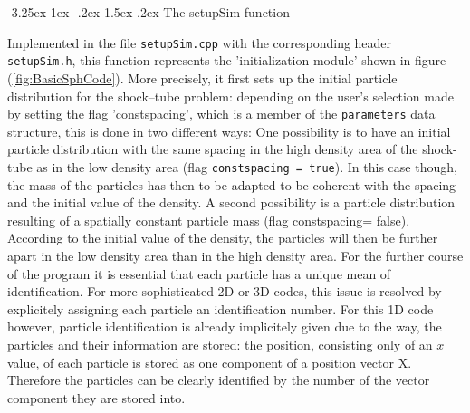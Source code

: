 \documentclass{report}
\makeatletter
\renewcommand\paragraph{\@startsection{paragraph}{4}{\z@}%
  {-3.25ex\@plus -1ex \@minus -.2ex}%
  {1.5ex \@plus .2ex}%
  {\normalfont\normalsize\bfseries}}
\makeatother
\begin{document}
\paragraph{The setupSim function}
\label{sec:1DSPHcode_functions_setupSim}

Implemented in the file {\tt setupSim.cpp} with the corresponding header {\tt setupSim.h}, this function represents the 'initialization module' shown in figure (\ref{fig:BasicSphCode}). More precisely, it first sets up the initial particle distribution for the shock--tube problem: depending on the user's selection made by setting the flag 'constspacing', which is a member of the {\tt parameters} data structure, this is done in two different ways:
One possibility is to have an initial particle distribution with the same spacing in the high density area of the shock-tube as in the low density area (flag {\tt constspacing = true}). In this case though, the mass of the particles has then to be adapted to be coherent with the spacing and the initial value of the density.
A second possibility is a particle distribution resulting of a spatially constant particle mass (flag constspacing= false). According to the initial value of the density, the particles will then be further apart in the low density area than in the high density area.
For the further course of the program it is essential that each particle has a unique mean of identification. For more sophisticated 2D or 3D codes, this issue is resolved by explicitely assigning each particle an identification number. For this 1D code however, particle identification is already implicitely given due to the way, the particles and their information are stored: the position, consisting only of an $x$ value, of each particle is stored as one component of a position vector X. Therefore the particles can be clearly identified by the number of the vector component they are stored into.
\end{document}
